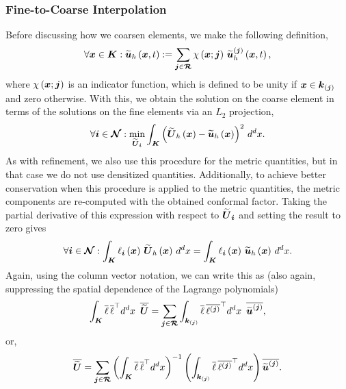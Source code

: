 \subsubsection{Fine-to-Coarse Interpolation}

Before discussing how we coarsen elements, we make the following definition,
\begin{equation}
  \forall\boldsymbol{x}\in\boldsymbol{K}:
  \widetilde{\boldsymbol{u}}_{h}\left(\boldsymbol{x},t\right)
  :=\sum\limits_{\boldsymbol{j}\in\boldsymbol{\mathcal{R}}}\chi\left(\boldsymbol{x};\boldsymbol{j}\right)\,
  \widetilde{\boldsymbol{u}}^{\left(\boldsymbol{j}\right)}_{h}\left(\boldsymbol{x},t\right),
\end{equation}
where $\chi\left(\boldsymbol{x};\boldsymbol{j}\right)$ is an indicator function, which is
defined to be unity if $\boldsymbol{x}\in\boldsymbol{k}_{\left(\boldsymbol{j}\right)}$ and zero
otherwise.
With this, we obtain the solution on the coarse
element in terms of the solutions
on the fine elements via an $L_{2}$ projection,
\begin{equation}
  \forall\boldsymbol{i}\in\boldsymbol{\mathcal{N}}:
  \min\limits_{\widetilde{\boldsymbol{U}}_{\boldsymbol{i}}}
  \int_{\boldsymbol{K}}
  \left(\widetilde{\boldsymbol{U}}_{h}\left(\boldsymbol{x}\right)
  -\widetilde{\boldsymbol{u}}_{h}\left(\boldsymbol{x}\right)\right)^{2}\,
  d^{d}x.
\end{equation}
As with refinement, we also use this procedure for the metric quantities,
but in that case we do not use densitized quantities.
Additionally, to achieve better conservation when this procedure is applied
to the metric quantities,
the metric components are re-computed with the obtained conformal factor.
Taking the partial derivative of this expression with respect to
$\widetilde{\boldsymbol{U}}_{\boldsymbol{i}}$ and setting the result to zero gives
\begin{equation}
  \forall\boldsymbol{i}\in\boldsymbol{\mathcal{N}}:
  \int_{\boldsymbol{K}}\ell_{\boldsymbol{i}}\left(\boldsymbol{x}\right)\,
  \widetilde{\boldsymbol{U}}_{h}\left(\boldsymbol{x}\right)\,d^{d}x
  =\int_{\boldsymbol{K}}\ell_{\boldsymbol{i}}\left(\boldsymbol{x}\right)\,
  \widetilde{\boldsymbol{u}}_{h}\left(\boldsymbol{x}\right)\,d^{d}x.
  \label{eq.coarsen}
\end{equation}
Again, using the column vector notation, we can write this as
(also again, suppressing the spatial dependence of the Lagrange
polynomials)
\begin{equation}
  \int_{\boldsymbol{K}}\overline{\ell}\,
  \overline{\ell}^{\top} d^{d}x\hspace{0.5em}
  \overline{\widetilde{\boldsymbol{U}}}
  =\sum\limits_{\boldsymbol{j}\in\boldsymbol{\mathcal{R}}}
  \int_{\boldsymbol{k}_{\left(\boldsymbol{j}\right)}}\overline{\ell}\,
  \overline{\ell^{\left(\boldsymbol{j}\right)}}^{\top} d^{d}x\hspace{0.5em}
  \overline{\widetilde{\boldsymbol{u}}^{\left(\boldsymbol{j}\right)}},
\end{equation}
or,
\begin{equation}
  \overline{\widetilde{\boldsymbol{U}}}
  =\sum\limits_{\boldsymbol{j}\in\boldsymbol{\mathcal{R}}}
  \left(\int_{\boldsymbol{K}}\overline{\ell}\,
  \overline{\ell}^{\top} d^{d}x\right)^{-1}
  \left(\int_{\boldsymbol{k}_{\left(\boldsymbol{j}\right)}}\overline{\ell}\,
  \overline{\ell^{\left(\boldsymbol{j}\right)}}^{\top} d^{d}x\right)
  \overline{\widetilde{\boldsymbol{u}}^{\left(\boldsymbol{j}\right)}}.
\end{equation}
